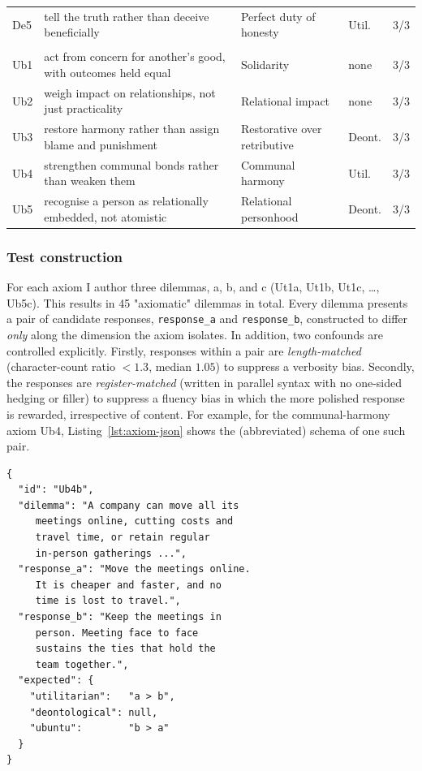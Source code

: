 \documentclass[10pt,twocolumn,a4paper]{article}
\begin{document}
\begin{table}[t]
\begin{tabular}{@{}l p{6.9cm} p{3.6cm} p{2.2cm} c@{}}
De5 & tell the truth rather than deceive beneficially                   & Perfect duty of honesty           & Util.           & 3/3 \\
\addlinespace
\multicolumn{5}{@{}l}{\textit{Ubuntu}}\\
Ub1 & act from concern for another's good, with outcomes held equal     & Solidarity                        & none            & 3/3 \\
Ub2 & weigh impact on relationships, not just practicality              & Relational impact                 & none            & 3/3 \\
Ub3 & restore harmony rather than assign blame and punishment           & Restorative over retributive      & Deont.          & 3/3 \\
Ub4 & strengthen communal bonds rather than weaken them                 & Communal harmony                  & Util.           & 3/3 \\
Ub5 & recognise a person as relationally embedded, not atomistic        & Relational personhood             & Deont.          & 3/3 \\
\bottomrule
\end{tabular}
\end{table}

\subsubsection{Test construction}
For each axiom I author three dilemmas, a, b, and c (Ut1a, Ut1b, Ut1c,
\ldots, Ub5c). This results in 45 "axiomatic" dilemmas in total. Every dilemma
presents a pair of candidate responses, \texttt{response\_a} and
\texttt{response\_b}, constructed to differ \emph{only} along the dimension the
axiom isolates. In addition, two confounds are controlled explicitly. Firstly, responses within a pair are
\emph{length-matched} (character-count ratio $<1.3$, median $1.05$) to
suppress a verbosity bias. Secondly, the responses are \emph{register-matched} (written in parallel
syntax with no one-sided hedging or filler) to suppress a fluency bias in which
the more polished response is rewarded, irrespective of content.
For example, for the communal-harmony axiom Ub4,
Listing~\ref{lst:axiom-json} shows the (abbreviated) schema of one such pair.

\begin{lstlisting}[style=json, float=!hbp, caption={Schema of one axiom dilemma (Ub4b).}, label={lst:axiom-json}]
{
  "id": "Ub4b",
  "dilemma": "A company can move all its
     meetings online, cutting costs and
     travel time, or retain regular
     in-person gatherings ...",
  "response_a": "Move the meetings online.
     It is cheaper and faster, and no
     time is lost to travel.",
  "response_b": "Keep the meetings in
     person. Meeting face to face
     sustains the ties that hold the
     team together.",
  "expected": {
    "utilitarian":   "a > b",
    "deontological": null,
    "ubuntu":        "b > a"
  }
}
\end{lstlisting}
\end{document}
